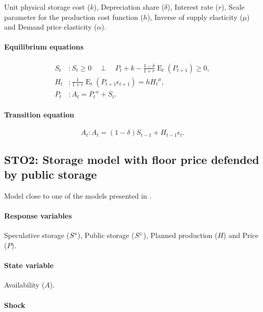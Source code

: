 \documentclass[11pt,fleqn]{article}
\DeclareMathOperator{\E}{E}
\newcommand{\Ss}{S^{\textsc{s}}}
\newcommand{\Sg}{S^{\textsc{g}}}
\newcommand{\CP}{\quad \perp \quad}
\begin{document}
Unit physical storage cost ($k$), Depreciation share ($\delta$), Interest rate
($r$), Scale parameter for the production cost function ($h$), Inverse of supply
elasticity ($\mu$) and Demand price elasticity ($\alpha$).

\paragraph{Equilibrium equations}

\begin{align}
  S_{t}&: S_{t}\ge 0 \CP P_{t}+k-\frac{1-\delta}{1+r}\E_{t}\left(P_{t+1}\right)\ge 0,\\
  H_{t}&: \frac{1}{1+r}\E_{t}\left(P_{t+1}\epsilon_{t+1}\right)=h {H_{t}}^{\mu},\\
  P_{t}&: A_{t}={P_{t}}^{\alpha}+S_{t}.
\end{align}

\paragraph{Transition equation}

\begin{equation}
  A_{t}: A_{t}=\left(1-\delta\right)S_{t-1}+H_{t-1}\epsilon_{t}.
\end{equation}

\subsection{STO2: Storage model with floor price defended by public storage}
\label{sec:storage-model-with}

Model close to one of the models presented in \citet{Wrig88a}.

\paragraph{Response variables}

Speculative storage ($\Ss$), Public storage ($\Sg$), Planned production ($H$) and
Price ($P$).

\paragraph{State variable}
\label{sec:state-variable}

Availability ($A$).

\paragraph{Shock}
\label{sec:shock}
\end{document}
